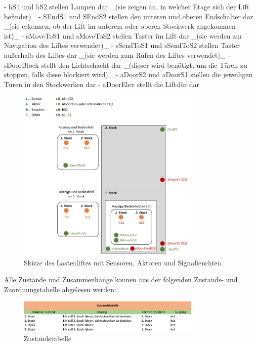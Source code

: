 \begin{markdown}
- hS1 und hS2 stellen Lampen dar _(sie zeigen an, in welcher Etage sich der Lift befindet)_
- SEndS1 und SEndS2 stellen den unteren und oberen Endschalter dar _(sie erkennen, ob der Lift im unterem oder oberen Stockwerk angekommen ist)_
- sMoveToS1 und sMoveToS2 stellen Taster im Lift dar _(sie werden zur Navigation des Liftes verwendet)_
- sSendToS1 und sSendToS2 stellen Taster außerhalb des Liftes dar _(sie werden zum Rufen des Liftes verwendet)_
- sDoorBlock stellt den Lichtschacht dar _(dieser wird benötigt, um die Türen zu stoppen, falls diese blockiert wird)_ 
- aDoorS2 und aDoorS1 stellen die jeweiligen Türen in den Stockwerken dar
- aDoorElev stellt die Liftdür dar

\begin{figure}[h!]
    \centering
    \includegraphics[width=0.8\textwidth]{./images/Skizze.png}
    \caption[Skizze des Lastenliftes]{Skizze des Lastenliftes mit Sensoren, Aktoren und Signalleuchten}
\end{figure}

Alle Zustände und Zusammenhänge können aus der folgenden Zustands- und Zuordnungstabelle abgelesen werden:

\begin{figure}[h!]
    \centering
    \includegraphics[width=0.8\textwidth]{./images/Zustandstabelle.png}
    \caption[Zustandstabelle]{Zustandstabelle}
\end{figure}


\end{markdown}
